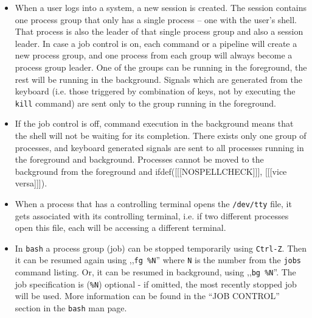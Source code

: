 \begin{itemize}
\item When a user logs into a system, a new session is created.  The session
contains one process group that only has a single process -- one with the user's
shell.  That process is also the leader of that single process group and also a
session leader.  In case a job control is on, each command or a pipeline will
create a new process group, and one process from each group will always become a
process group leader.  One of the groups can be running in the foreground, the
rest will be running in the background.  Signals which are generated from the
keyboard (i.e. those triggered by combination of keys, not by executing the
\texttt{kill} command) are sent only to the group running in the foreground.
\item If the job control is off, command execution in the background means that
the shell will not be waiting for its completion.  There exists only one group of
processes, and keyboard generated signals are sent to all processes running in
the foreground and background.  Processes cannot be moved to the background from
the foreground and ifdef([[[NOSPELLCHECK]]], [[[vice versa]]]).
\item When a process that has a controlling terminal opens the \texttt{/dev/tty}
file, it gets associated with its controlling terminal, i.e. if two different
processes open this file, each will be accessing a different terminal.
\item In \texttt{bash} a process group (job) can be stopped temporarily using
\texttt{Ctrl-Z}. Then it can be resumed again using ,,\texttt{fg \%N}'' where
\texttt{N} is the number from the \texttt{jobs} command listing. Or, it can
be resumed in background, using ,,\texttt{bg \%N}''. The job specification
is (\texttt{\%N}) optional - if omitted, the most recently stopped job will be
used. More information can be found in the ``JOB CONTROL'' section in the
\texttt{bash} man page.
\end{itemize}


\begin{slide}
\begin{center}

\end{center}
\end{slide}

